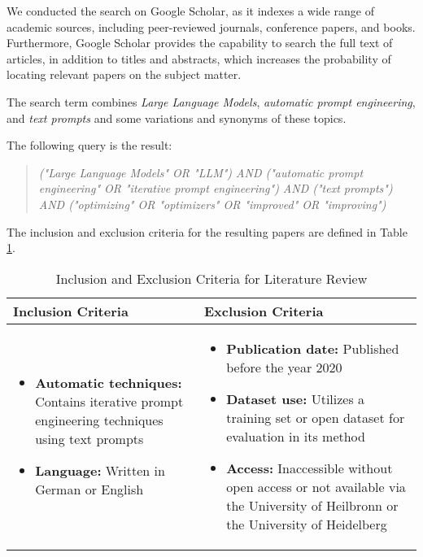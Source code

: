 \documentclass[runningheads]{llncs}
\begin{document}
We conducted the search on Google Scholar, as it indexes a wide range of academic sources, including peer-reviewed journals, conference papers, and books. Furthermore, Google Scholar provides the capability to search the full text of articles, in addition to titles and abstracts, which increases the probability of locating relevant papers on the subject matter.


The search term combines \textit{Large Language Models}, \textit{automatic prompt engineering}, and \textit{text prompts} and some variations and synonyms of these topics. 

The following query is the result: 
\newline
\begin{quote}
\textit{("Large Language Models" OR "LLM") \newline
AND 
\newline
("automatic prompt engineering" OR "iterative prompt engineering")
\newline 
AND 
\newline
("text prompts")
\newline
AND 
\newline
("optimizing" OR "optimizers" OR "improved" OR "improving")} 
\end{quote}

The inclusion and exclusion criteria for the resulting papers are defined in Table \ref{tab:criteria}.

\begin{table}[t]
\centering
\caption{Inclusion and Exclusion Criteria for Literature Review}
\renewcommand{\arraystretch}{1.5} %
\setlength{\tabcolsep}{12pt} %
\begin{tabular}{|p{}|p{}|}
\hline
\textbf{Inclusion Criteria} & \textbf{Exclusion Criteria} \\ \hline
\begin{itemize}
    \item \textbf{Automatic techniques:} Contains iterative prompt engineering techniques using text prompts
    \item \textbf{Language:} Written in German or English
\end{itemize} & 
\begin{itemize}
    \item \textbf{Publication date:} Published before the year 2020
    \item \textbf{Dataset use:} Utilizes a training set or open dataset for evaluation in its method
    \item \textbf{Access:} Inaccessible without open access or not available via the University of Heilbronn or the University of Heidelberg
\end{itemize} \\ \hline
\end{tabular}
\label{tab:criteria}
\end{table}
\end{document}
